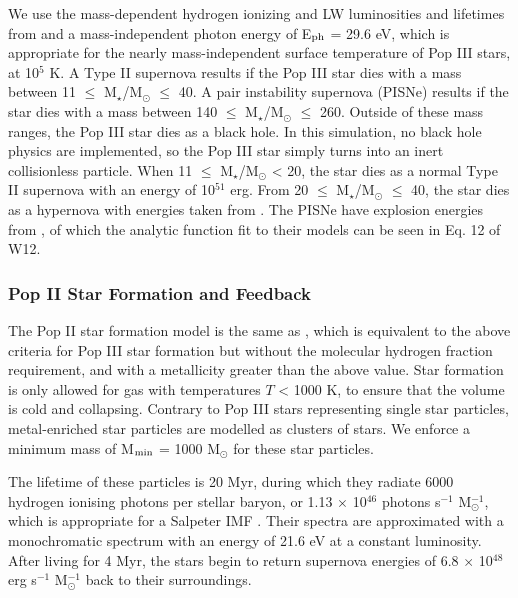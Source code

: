 \documentclass[fleqn,usenatbib]{mnras}
\begin{document}
We use the mass-dependent hydrogen ionizing and LW luminosities and lifetimes from \citet{Schaerer02} and a mass-independent photon energy of E$_{\rm ph}$ = 29.6 eV, which is appropriate for the nearly mass-independent surface temperature of Pop III stars, at 10$^{5}$ K. A Type II supernova results if the Pop III star dies with a mass between 11 $\leq$ M$_{\star}$/M$_{\odot}$ $\leq$ 40. A pair instability supernova (PISNe) results if the star dies with a mass between 140 $\leq$ M$_{\star}$/M$_{\odot}$ $\leq$ 260. Outside of these mass ranges, the Pop III star dies as a black hole. In this simulation, no black hole physics are implemented, so the Pop III star simply turns into an inert collisionless particle. When 11 $\leq$ M$_{\star}$/M$_{\odot}$ < 20, the star dies as a normal Type II supernova with an energy of 10$^{51}$ erg. From 20 $\leq$ M$_{\star}$/M$_{\odot}$ $\leq$ 40, the star dies as a hypernova with energies taken from \citet{Nomoto06}. The PISNe have explosion energies from \citet{2002ApJ...567..532H}, of which the analytic function fit to their models can be seen in Eq. 12 of W12. 

\subsubsection{Pop II Star Formation and Feedback}
The Pop II star formation model is the same as \citet{Wise09}, which is equivalent to the above criteria for Pop III star formation but without the molecular hydrogen fraction requirement, and with a metallicity greater than the above value. Star formation is only allowed for gas with temperatures $T$ < 1000 K, to ensure that the volume is cold and collapsing. Contrary to Pop III stars representing single star particles, metal-enriched star particles are modelled as clusters of stars. We enforce a minimum mass of M$_{\rm min}$ = 1000 M$_{\odot}$ for these star particles. 

The lifetime of these particles is 20 Myr, during which they radiate 6000 hydrogen ionising photons per stellar baryon, or 1.13 $\times$ 10$^{46}$ photons s$^{-1}$ M$_{\odot}^{-1}$, which is appropriate for a Salpeter IMF \citep{Schaerer03}. Their spectra are approximated with a monochromatic spectrum with an energy of 21.6 eV at a constant luminosity. After living for 4 Myr, the stars begin to return supernova energies of 6.8 $\times$ 10$^{48}$ erg s$^{-1}$ M$_{\odot}^{-1}$ back to their surroundings.
\end{document}

